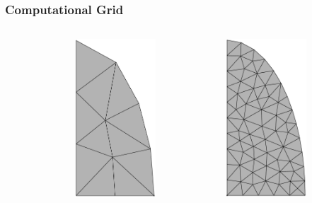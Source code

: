 \documentclass[aspectratio=169,11pt]{beamer}
\theoremstyle{definition}
\begin{document}
\begin{frame}
  \frametitle{Computational Grid}
  \begin{columns}
    \begin{column}{0.3\textwidth}
    \end{column}
    \begin{column}{0.3\textwidth}
      \includegraphics[width=3cm]{ellipsemeshcoarse-cropped}
    \end{column}
    \begin{column}{0.3\textwidth}
      \includegraphics[width=3cm]{ellipsemesh-cropped}
    \end{column}
  \end{columns}
\end{frame}
\end{document}
